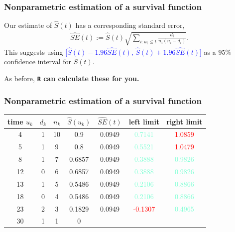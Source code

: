 \documentclass[12pt, 
hyperref={colorlinks=true, linkcolor=blue, urlcolor=cyan},dvipsnames]{beamer}
\begin{document}
\begin{frame}
\frametitle{Nonparametric estimation of a survival function}

Our estimate of $\widehat{S}(t)$ has a corresponding standard error,
\begin{align*}
\widehat{SE}(t) := \widehat{S}(t)\sqrt{\sum_{i : u_i \leq t}\frac{d_i}{n_i(n_i - d_i)}}.
\end{align*}
This suggests using 
\textcolor{blue}{[$\widehat{S}(t) - 1.96 \widehat{SE}(t)$, $\widehat{S}(t) + 1.96 \widehat{SE}(t)$]} as a 95\% confidence interval for $S(t)$.

As before, \textbf{\texttt{R} can calculate these for you.}
\end{frame}

\begin{frame}
\frametitle{Nonparametric estimation of a survival function}
\begin{tabular}{|c|c|c|c|c|c|c|}
\hline
time $u_k$ & $d_k$ & $n_k$ & $\widehat{S}(u_k)$ & $\widehat{SE}(t)$ & left limit & right limit \\
\hline
4 & 1 & 10 & 0.9 & 0.0949 & \textcolor{Aquamarine}{0.7141} & \textcolor{red}{1.0859} \\
5 & 1 & 9 &  0.8 & 0.0949 & \textcolor{Aquamarine}{0.5521} & \textcolor{red}{1.0479}\\
8 & 1 & 7 & 0.6857 & 0.0949 & \textcolor{Aquamarine}{0.3888} & \textcolor{Aquamarine}{0.9826}\\
12 & 0 & 6 & 0.6857 & 0.0949 & \textcolor{Aquamarine}{0.3888} & \textcolor{Aquamarine}{0.9826}\\
13 & 1 & 5 & 0.5486 & 0.0949 & \textcolor{Aquamarine}{0.2106} & \textcolor{Aquamarine}{0.8866}\\
18 & 0 & 4 & 0.5486 & 0.0949 & \textcolor{Aquamarine}{0.2106} & \textcolor{Aquamarine}{0.8866}\\
23 & 2 & 3 & 0.1829 & 0.0949 & \textcolor{red}{-0.1307} & \textcolor{Aquamarine}{0.4965}\\
30 & 1 & 1 & 0 & & & \\
\hline
\end{tabular}
\end{frame}
\end{document}
